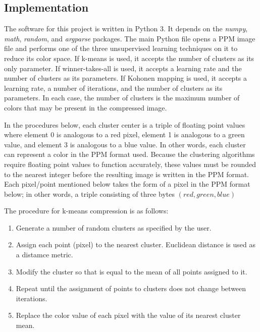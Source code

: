 \documentclass[letter,11pt,titlepage]{article}
\begin{document}
\subsection{Implementation}
The software for this project is written in Python 3. It depends on the \textit{numpy}, \textit{math}, \textit{random}, and \textit{argparse} packages. The main Python file opens a PPM image file and performs one of the three unsupervised learning techniques on it to reduce its color space. If k-means is used, it accepts the number of clusters as its only parameter. If winner-takes-all is used, it accepts a learning rate and the number of clusters as its parameters. If Kohonen mapping is used, it accepts a learning rate, a number of iterations, and the number of clusters as its parameters. In each case, the number of clusters is the maximum number of colors that may be present in the compressed image. 

In the procedures below, each cluster center is a triple of floating point values where element 0 is analogous to a red pixel, element 1 is analogous to a green value, and element 3 is analogous to a blue value. In other words, each cluster can represent a color in the PPM format used. Because the clustering algorithms require floating point values to function accurately, these values must be rounded to the nearest integer before the resulting image is written in the PPM format. Each pixel/point mentioned below takes the form of a pixel in the PPM format below; in other words, a triple consisting of three bytes \((red, green, blue)\)

The procedure for k-means compression is as follows\cite{Class}:
\begin{enumerate}
    \item Generate a number of random clusters as specified by the user.
    \item Assign each point (pixel) to the nearest cluster. Euclidean distance is used as a distamce metric.
    \item Modify the cluster so that is equal to the mean of all points assigned to it.
    \item Repeat until the assignment of points to clusters does not change between iterations.
    \item Replace the color value of each pixel with the value of its nearest cluster mean.
\end{enumerate}
\end{document}
